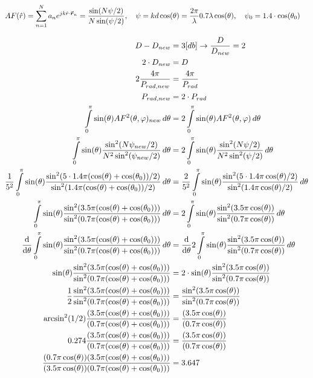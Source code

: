 \documentclass[12pt, letterpaper]{article}
\begin{document}
\begin{align}
    AF(\hat{r})&=\sum_{n=1}^N a_n e^{jk\hat{r}\cdot\va*{r}_n}=\frac{\sin(N\psi/2)}{N\sin(\psi/2)}
    ,\quad \psi=kd\cos(\theta)=\frac{2\pi}{\lambda}0.7\lambda\cos(\theta)
    ,\quad \psi_0=1.4\cdot\cos(\theta_0)
\end{align}

\begin{align}
    D-D_{new}&=3[db]\rightarrow\frac{D}{D_{new}}=2\\
    2\cdot D_{new}&=D\\
    2\frac{4\pi}{P_{rad,new}}&=\frac{4\pi}{P_{rad}}\\
    P_{rad,new}&=2\cdot P_{rad}\\
    \int\limits_0^\pi \sin(\theta)AF^2(\theta,\varphi)_{new}\,d\theta
    &=
    2\int\limits_0^\pi \sin(\theta)AF^2(\theta,\varphi)\,d\theta\\
    \int\limits_0^\pi \sin(\theta)\frac{\sin^2(N\psi_{new}/2)}{N^2\sin^2(\psi_{new}/2)}\,d\theta
    &=
    2\int\limits_0^\pi \sin(\theta)\frac{\sin^2(N\psi/2)}{N^2\sin^2(\psi/2)}\,d\theta
    \\
    \frac{1}{5^2}\int\limits_0^\pi \sin(\theta)\frac{\sin^2(5\cdot1.4\pi(\cos(\theta)+\cos(\theta_0))/2)}{\sin^2(1.4\pi(\cos(\theta)+\cos(\theta_0))/2)}\,d\theta
    &=
    \frac{2}{5^2}\int\limits_0^\pi \sin(\theta)\frac{\sin^2(5\cdot1.4\pi\cos(\theta)/2)}{\sin^2(1.4\pi\cos(\theta)/2)}\,d\theta
    \\
    \int\limits_0^\pi \sin(\theta)\frac{\sin^2(3.5\pi(\cos(\theta)+\cos(\theta_0)))}{\sin^2(0.7\pi(\cos(\theta)+\cos(\theta_0)))}\,d\theta
    &=
    2\int\limits_0^\pi \sin(\theta)\frac{\sin^2(3.5\pi\cos(\theta))}{\sin^2(0.7\pi\cos(\theta))}\,d\theta
    \\
    \dv{\theta}
    \int\limits_0^\pi \sin(\theta)\frac{\sin^2(3.5\pi(\cos(\theta)+\cos(\theta_0)))}{\sin^2(0.7\pi(\cos(\theta)+\cos(\theta_0)))}\,d\theta
    &=
    \dv{\theta}
    2\int\limits_0^\pi \sin(\theta)\frac{\sin^2(3.5\pi\cos(\theta))}{\sin^2(0.7\pi\cos(\theta))}\,d\theta
    \\
    \sin(\theta)\frac{\sin^2(3.5\pi(\cos(\theta)+\cos(\theta_0)))}{\sin^2(0.7\pi(\cos(\theta)+\cos(\theta_0)))}
    &=
    2\cdot \sin(\theta)\frac{\sin^2(3.5\pi\cos(\theta))}{\sin^2(0.7\pi\cos(\theta))}
    \\
    \frac{1}{2}\frac{\sin^2(3.5\pi(\cos(\theta)+\cos(\theta_0)))}{\sin^2(0.7\pi(\cos(\theta)+\cos(\theta_0)))}
    &=
    \frac{\sin^2(3.5\pi\cos(\theta))}{\sin^2(0.7\pi\cos(\theta))}
    \\
    \arcsin^2(1/2)\frac{(3.5\pi(\cos(\theta)+\cos(\theta_0)))}{(0.7\pi(\cos(\theta)+\cos(\theta_0)))}
    &=
    \frac{(3.5\pi\cos(\theta))}{(0.7\pi\cos(\theta))}
    \\
    0.274\frac{(3.5\pi(\cos(\theta)+\cos(\theta_0)))}{(0.7\pi(\cos(\theta)+\cos(\theta_0)))}
    &=
    \frac{(3.5\pi\cos(\theta))}{(0.7\pi\cos(\theta))}
    \\
    \frac{(0.7\pi\cos(\theta))(3.5\pi(\cos(\theta)+\cos(\theta_0)))}{(3.5\pi\cos(\theta))(0.7\pi(\cos(\theta)+\cos(\theta_0)))}
    &=
    3.647
\end{align}
\end{document}
